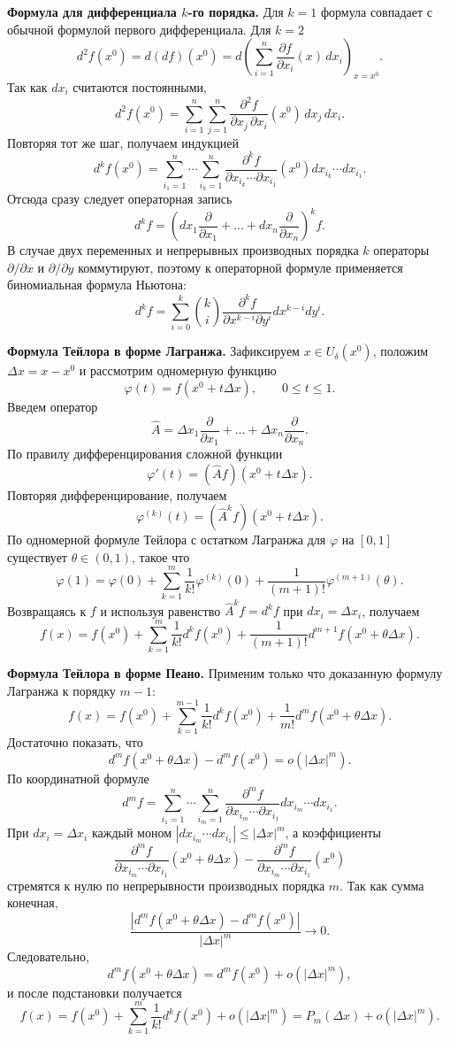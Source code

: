 \documentclass[12pt,a4paper]{article}
\newcommand{\Dx}{\Delta x}
\begin{document}
\textbf{Формула для дифференциала \(k\)-го порядка.}
Для \(k=1\) формула совпадает с обычной формулой первого дифференциала.
Для \(k=2\)
\[
  d^2f(x^0)=d(df)(x^0)
  =
  d\left(\sum_{i=1}^n
  \frac{\partial f}{\partial x_i}(x)\,dx_i\right)_{x=x^0}.
\]
Так как \(dx_i\) считаются постоянными,
\[
  d^2 f(x^0)
  =
  \sum_{i=1}^n\sum_{j=1}^n
  \frac{\partial^2 f}{\partial x_j\,\partial x_i}(x^0)\,dx_j\,dx_i.
\]
Повторяя тот же шаг, получаем индукцией
\[
  d^k f(x^0)
  =
  \sum_{i_1=1}^n\cdots\sum_{i_k=1}^n
  \frac{\partial^k f}
       {\partial x_{i_k}\cdots\partial x_{i_1}}(x^0)
  dx_{i_k}\cdots dx_{i_1}.
\]
Отсюда сразу следует операторная запись
\[
  d^k f
  =
  \left(
    dx_1\frac{\partial}{\partial x_1}
    +\dots+
    dx_n\frac{\partial}{\partial x_n}
  \right)^k f.
\]
В случае двух переменных и непрерывных производных порядка \(k\) операторы
\(\partial/\partial x\) и \(\partial/\partial y\) коммутируют, поэтому к
операторной формуле применяется биномиальная формула Ньютона:
\[
  d^k f
  =
  \sum_{i=0}^k
  \binom{k}{i}
  \frac{\partial^k f}{\partial x^{k-i}\partial y^i}
  dx^{k-i}dy^i.
\]

\textbf{Формула Тейлора в форме Лагранжа.}
Зафиксируем \(x\in U_\delta(x^0)\), положим \(\Dx=x-x^0\) и рассмотрим
одномерную функцию
\[
  \varphi(t)=f(x^0+t\Dx),\qquad 0\le t\le1.
\]
Введем оператор
\[
  \widehat A
  =
  \Delta x_1\frac{\partial}{\partial x_1}
  +\dots+
  \Delta x_n\frac{\partial}{\partial x_n}.
\]
По правилу дифференцирования сложной функции
\[
  \varphi'(t)=(\widehat A f)(x^0+t\Dx).
\]
Повторяя дифференцирование, получаем
\[
  \varphi^{(k)}(t)=(\widehat A^k f)(x^0+t\Dx).
\]
По одномерной формуле Тейлора с остатком Лагранжа для \(\varphi\) на
\([0,1]\) существует \(\theta\in(0,1)\), такое что
\[
  \varphi(1)
  =
  \varphi(0)
  +\sum_{k=1}^m\frac{1}{k!}\varphi^{(k)}(0)
  +\frac{1}{(m+1)!}\varphi^{(m+1)}(\theta).
\]
Возвращаясь к \(f\) и используя равенство
\(\widehat A^k f=d^k f\) при \(dx_i=\Delta x_i\), получаем
\[
  f(x)
  =
  f(x^0)
  +\sum_{k=1}^m\frac{1}{k!}d^k f(x^0)
  +\frac{1}{(m+1)!}d^{m+1}f(x^0+\theta\Dx).
\]

\textbf{Формула Тейлора в форме Пеано.}
Применим только что доказанную формулу Лагранжа к порядку \(m-1\):
\[
  f(x)
  =
  f(x^0)
  +\sum_{k=1}^{m-1}\frac{1}{k!}d^k f(x^0)
  +\frac{1}{m!}d^m f(x^0+\theta\Dx).
\]
Достаточно показать, что
\[
  d^m f(x^0+\theta\Dx)-d^m f(x^0)=o(|\Dx|^m).
\]
По координатной формуле
\[
  d^m f
  =
  \sum_{i_1=1}^n\cdots\sum_{i_m=1}^n
  \frac{\partial^m f}
       {\partial x_{i_m}\cdots\partial x_{i_1}}
  dx_{i_m}\cdots dx_{i_1}.
\]
При \(dx_i=\Delta x_i\) каждый моном
\(|dx_{i_m}\cdots dx_{i_1}|\le |\Dx|^m\), а коэффициенты
\[
  \frac{\partial^m f}
       {\partial x_{i_m}\cdots\partial x_{i_1}}(x^0+\theta\Dx)
  -
  \frac{\partial^m f}
       {\partial x_{i_m}\cdots\partial x_{i_1}}(x^0)
\]
стремятся к нулю по непрерывности производных порядка \(m\). Так как сумма
конечная,
\[
  \frac{|d^m f(x^0+\theta\Dx)-d^m f(x^0)|}{|\Dx|^m}\to0.
\]
Следовательно,
\[
  d^m f(x^0+\theta\Dx)
  =
  d^m f(x^0)+o(|\Dx|^m),
\]
и после подстановки получается
\[
  f(x)
  =
  f(x^0)
  +\sum_{k=1}^m\frac{1}{k!}d^k f(x^0)
  +o(|\Dx|^m)
  =
  P_m(\Dx)+o(|\Dx|^m).
\]
\end{document}
